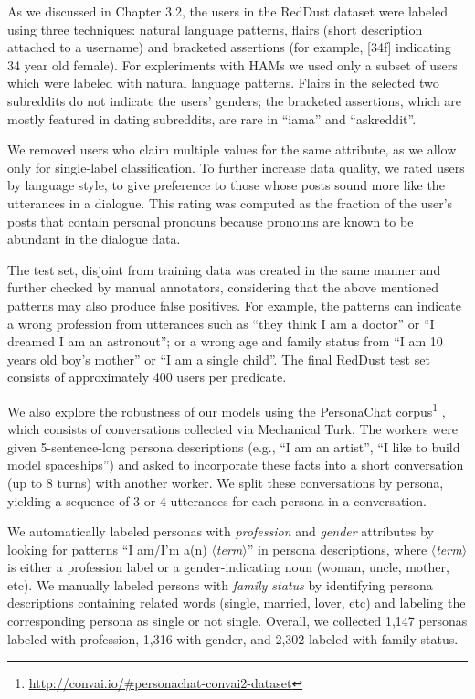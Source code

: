As we discussed in Chapter 3.2, the users in the RedDust dataset were labeled using three techniques: natural language patterns, flairs (short description attached to a username) and bracketed assertions (for example, [34f] indicating 34 year old female). For expleriments with HAMs we used only a subset of users which were labeled with natural language patterns. Flairs in the selected two subreddits do not indicate the users' genders; the bracketed assertions, which are mostly featured in dating subreddits, are rare in ``iama'' and ``askreddit''.

We removed users who claim multiple values for the
same attribute, as we allow only for single-label classification. 
To further increase data quality, we rated users by language style, to give preference to those whose posts sound more like the utterances in a dialogue. This rating was computed as
the fraction of the user's posts that contain personal pronouns because pronouns are known to be abundant in the dialogue data.

The test set, disjoint from training data was created in the same manner and further checked by manual annotators, considering that the above mentioned patterns may also produce false positives.
For example, the patterns can indicate a wrong profession from utterances such as ``they think I am a doctor'' or ``I dreamed  I am an astronout''; or a wrong age and family status
from ``I am 10 years old boy's mother'' or
``I am a single child''.
The final RedDust test set consists of approximately 400 users per predicate.

 We also explore the robustness of our models using the PersonaChat corpus\footnote{\href{http://convai.io/\#personachat-convai2-dataset}{http://convai.io/\#personachat-convai2-dataset}} \cite{zhang2018personalizing},
which consists of conversations collected via Mechanical Turk.
The workers were given 5-sentence-long persona descriptions (e.g., ``I am an artist'', ``I like to build model spaceships'') and asked to incorporate these facts into a short conversation (up to 8 turns) with another worker.
We split these conversations by persona, yielding a sequence of 3 or 4 utterances for each persona in a conversation.

We automatically labeled personas with \textit{profession} and \textit{gender} attributes by looking for patterns ``I am/I'm a(n) $\langle$\textit{term}$\rangle$'' in persona descriptions, where 
$\langle$\textit{term}$\rangle$ is either a profession label
or a gender-indicating noun (woman, uncle, mother, etc).
We manually labeled persons with \textit{family status} by identifying persona
descriptions containing related words (single, married, lover, etc) and labeling the corresponding persona as single or not single.
Overall, we collected 1,147 personas labeled with profession, 1,316 with gender, and 2,302 labeled with family status.

